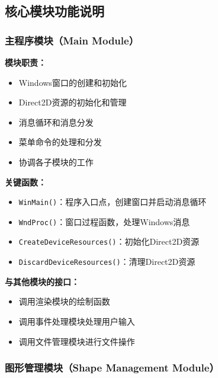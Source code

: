\documentclass[12pt,a4paper]{article}
\begin{document}
\subsection{核心模块功能说明}

\subsubsection{主程序模块（Main Module）}

\begin{tcolorbox}
\textbf{模块职责：}
\begin{itemize}
    \item Windows窗口的创建和初始化
    \item Direct2D资源的初始化和管理
    \item 消息循环和消息分发
    \item 菜单命令的处理和分发
    \item 协调各子模块的工作
\end{itemize}

\textbf{关键函数：}
\begin{itemize}
    \item \texttt{WinMain()}：程序入口点，创建窗口并启动消息循环
    \item \texttt{WndProc()}：窗口过程函数，处理Windows消息
    \item \texttt{CreateDeviceResources()}：初始化Direct2D资源
    \item \texttt{DiscardDeviceResources()}：清理Direct2D资源
\end{itemize}

\textbf{与其他模块的接口：}
\begin{itemize}
    \item 调用渲染模块的绘制函数
    \item 调用事件处理模块处理用户输入
    \item 调用文件管理模块进行文件操作
\end{itemize}
\end{tcolorbox}

\subsubsection{图形管理模块（Shape Management Module）}
\end{document}
